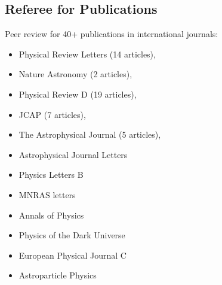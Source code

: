 \documentclass[11pt,a4paper]{article}
\begin{document}
\subsection*{Referee for Publications}
Peer review for 40+ publications in international journals:
\begin{itemize}\setlength{\itemsep}{1pt}
  \item {Physical Review Letters} (14 articles), %
\item {Nature Astronomy} (2 articles), %
\item {Physical Review D} (19 articles), %
\item {JCAP} (7 articles), %
\item {The Astrophysical Journal} (5 articles), %
\item {Astrophysical Journal Letters} %
 \item {Physics Letters B} %
\item {MNRAS letters} %
\item {Annals of Physics} %
 \item {Physics of the Dark Universe} %
 \item {European Physical Journal C} %
\item  {Astroparticle Physics} %
\end{itemize}
\vspace{-.2cm}


\newpage



\end{document}
